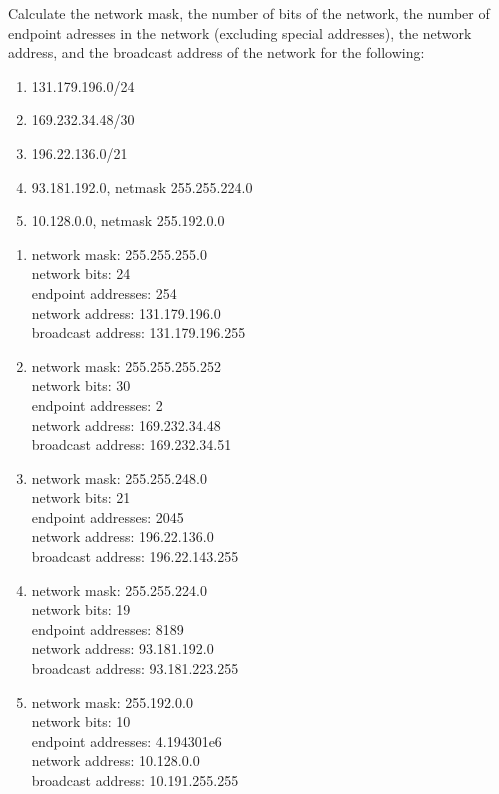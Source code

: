 \documentclass{report}
\begin{document}
\clearpage
\begin{problem}
Calculate the network mask, the number of bits of the network, the number of endpoint adresses in the network (excluding special addresses), the network address, and the broadcast address of the network for the following:

\begin{enumerate}
\item 131.179.196.0/24
\item 169.232.34.48/30
\item 196.22.136.0/21
\item 93.181.192.0, netmask 255.255.224.0
\item 10.128.0.0, netmask 255.192.0.0
\end{enumerate}


\begin{answer}{30em}
  \begin{enumerate}
    \item network mask: 255.255.255.0\\
          network bits: 24\\
          endpoint addresses: 254\\
          network address: 131.179.196.0\\
          broadcast address: 131.179.196.255

    \item network mask: 255.255.255.252\\
          network bits: 30\\
          endpoint addresses: 2\\
          network address: 169.232.34.48\\
          broadcast address: 169.232.34.51

    \item network mask: 255.255.248.0\\
          network bits: 21\\
          endpoint addresses: 2045\\
          network address: 196.22.136.0\\
          broadcast address: 196.22.143.255

    \item network mask: 255.255.224.0\\
          network bits: 19\\
          endpoint addresses: 8189\\
          network address: 93.181.192.0\\
          broadcast address: 93.181.223.255

    \item network mask: 255.192.0.0\\
          network bits: 10\\
          endpoint addresses: 4.194301e6\\
          network address: 10.128.0.0\\
          broadcast address: 10.191.255.255
  \end{enumerate}
\end{answer}

\end{problem}
\end{document}

